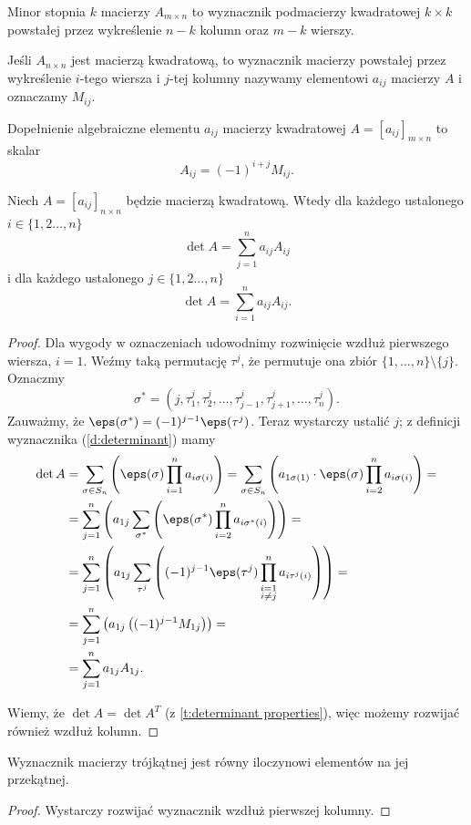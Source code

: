 \begin{definition}
    Minor stopnia $k$ macierzy $A_{m\times n}$ to wyznacznik podmacierzy kwadratowej $k\times k$ powstałej przez wykreślenie $n-k$ kolumn oraz $m-k$ wierszy.
\end{definition}

Jeśli $A_{n\times n}$ jest macierzą kwadratową, to wyznacznik macierzy powstałej przez wykreślenie $i$-tego wiersza i $j$-tej kolumny nazywamy  elementowi $a_{ij}$ macierzy $A$ i oznaczamy $M_{ij}$.

\begin{definition}
    Dopełnienie algebraiczne elementu $a_{ij}$ macierzy kwadratowej $A = [a_{ij}]_{m\times n}$ to skalar
    \[ A_{ij} = (-1)^{i+j}M_{ij}. \]
\end{definition}

\begin{theorem}
    \label{t:Laplace}
    Niech $A = [a_{ij}]_{n\times n}$ będzie macierzą kwadratową. Wtedy dla każdego ustalonego $i \in \{1,2\ldots,n\}$
    \[ \det A = \sum_{j=1}^n a_{ij}A_{ij} \]
    i dla każdego ustalonego $j \in \{1,2\ldots,n\}$
    \[ \det A = \sum_{i=1}^n a_{ij}A_{ij}. \]
\end{theorem}
\begin{proof}
    Dla wygody w oznaczeniach udowodnimy rozwinięcie wzdłuż pierwszego wiersza, $i = 1$. Weźmy taką permutację $\tau^j$, że permutuje ona zbiór $\{1, \ldots, n\} \setminus \{j\}$. Oznaczmy
    \[ \sigma^* = (j, \tau^j_1, \tau^j_2, \ldots, \tau^j_{j-1}, \tau^j_{j+1}, \ldots, \tau^j_{n}). \]
    Zauważmy, że $\eps(\sigma^*) = (-1)^{j-1} \eps(\tau^j)$. Teraz wystarczy ustalić $j$; z definicji wyznacznika (\ref{d:determinant}) mamy
    \begin{align*}
        \det A &= \sum_{\sigma\in S_n} \left(\eps(\sigma) \prod_{i=1}^n a_{i\sigma(i)}\right) = \sum_{\sigma\in S_n} \left(a_{1\sigma(1)} \cdot \eps(\sigma) \prod_{i=2}^n a_{i\sigma(i)}\right) = \\
        &= \sum_{j=1}^n \left(a_{1j} \sum_{\sigma^*} \left(\eps(\sigma^*) \prod_{i=2}^n a_{i\sigma^*(i)}\right)\right) = \\
        &= \sum_{j=1}^n \left(a_{1j} \sum_{\tau^j} \left((-1)^{j-1}\eps(\tau^j) \prod_{\substack{i=1\\i\neq j}}^n a_{i\tau^j(i)}\right)\right) = \\
        &= \sum_{j=1}^n \left(a_{1j} \left((-1)^{j-1} M_{1j}\right)\right) = \\
        &= \sum_{j=1}^n a_{1j} A_{1j}.
    \end{align*}

    Wiemy, że $\det A = \det A^T$ (z \ref{t:determinant properties}), więc możemy rozwijać również wzdłuż kolumn.
\end{proof}

\begin{corollary}
    \label{c:determinant in triangular matrix}
    Wyznacznik macierzy trójkątnej jest równy iloczynowi elementów na jej przekątnej.
\end{corollary}
\begin{proof}
    Wystarczy rozwijać wyznacznik wzdłuż pierwszej kolumny.
\end{proof}